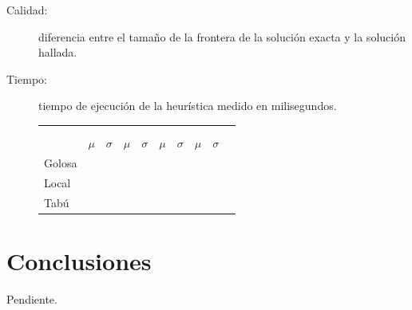 \documentclass[a4paper, 10pt, twoside]{article}
\begin{document}
\begin{description}
	\item[Calidad:] diferencia entre el tamaño de la frontera de la solución exacta y la solución hallada. 
	\item[Tiempo:] tiempo de ejecución de la heurística medido en milisegundos.
\end{description}



\begin{figure}[H]
	\begin{tabularx}{\textwidth}{ |>{\small}X| *9{ >{\small\centering}X|} }
		\hline
		 &
		 &
		\tabularnewline
		
		&
		 &
		 &
		 &
		\tabularnewline

		& $\mu$ & $\sigma$ & $\mu$ & $\sigma$ & $\mu$ & $\sigma$ & $\mu$ & $\sigma$
		\tabularnewline

		\hline
		Golosa &
		\golosaentrenamientocalidadmu &
		\golosaentrenamientocalidadsigma &
		\golosaentrenamientotiempomu &
		\golosaentrenamientotiemposigma &
		\golosatestingcalidadmu &
		\golosatestingcalidadsigma &
		\golosatestingtiempomu &
		\golosatestingtiemposigma
		\tabularnewline

		\hline
		Local &
		\localentrenamientocalidadmu &
		\localentrenamientocalidadsigma &
		\localentrenamientotiempomu &
		\localentrenamientotiemposigma &
		\localtestingcalidadmu &
		\localtestingcalidadsigma &
		\localtestingtiempomu &
		\localtestingtiemposigma
		\tabularnewline

		\hline
		Tabú &
		\tabuentrenamientocalidadmu &
		\tabuentrenamientocalidadsigma &
		\tabuentrenamientotiempomu &
		\tabuentrenamientotiemposigma &
		\tabutestingcalidadmu &
		\tabutestingcalidadsigma &
		\tabutestingtiempomu &
		\tabutestingtiemposigma
		\tabularnewline

		\hline
	\end{tabularx}
\end{figure}


\section{Conclusiones}

Pendiente.
\end{document}
